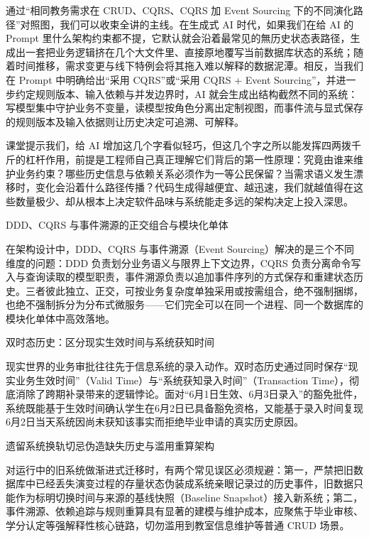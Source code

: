 \documentclass[UTF8,a4paper,11pt,fontset=fandol]{ctexart}
\begin{document}
通过“相同教务需求在 CRUD、CQRS、CQRS 加 Event Sourcing 下的不同演化路径”对照图，我们可以收束全讲的主线。在生成式 AI 时代，如果我们在给 AI 的 Prompt 里什么架构约束都不提，它默认就会沿着最常见的無历史状态表路径，生成出一套把业务逻辑挤在几个大文件里、直接原地覆写当前数据库状态的系统；随着时间推移，需求变更与线下特例会将其拖入难以解释的数据泥潭。相反，当我们在 Prompt 中明确给出“采用 CQRS”或“采用 CQRS + Event Sourcing”，并进一步约定规则版本、输入依赖与并发边界时，AI 就会生成出结构截然不同的系统：写模型集中守护业务不变量，读模型按角色分离出定制视图，而事件流与显式保存的规则版本及输入依据则让历史决定可追溯、可解释。

课堂提示我们，给 AI 增加这几个字看似轻巧，但这几个字之所以能发挥四两拨千斤的杠杆作用，前提是工程师自己真正理解它们背后的第一性原理：究竟由谁来维护业务约束？哪些历史信息与依赖关系必须作为一等公民保留？当需求语义发生漂移时，变化会沿着什么路径传播？代码生成得越便宜、越迅速，我们就越值得在这些数量极少、却从根本上决定软件品味与系统能走多远的架构决定上投入深思。

\begin{importantbox}{DDD、CQRS 与事件溯源的正交组合与模块化单体}

在架构设计中，DDD、CQRS 与事件溯源（Event Sourcing）解决的是三个不同维度的问题：DDD 负责划分业务语义与限界上下文边界，CQRS 负责分离命令写入与查询读取的模型职责，事件溯源负责以追加事件序列的方式保存和重建状态历史。三者彼此独立、正交，可按业务复杂度单独采用或按需组合，绝不强制捆绑，也绝不强制拆分为分布式微服务——它们完全可以在同一个进程、同一个数据库的模块化单体中高效落地。

\end{importantbox}

\begin{knowledgebox}{双时态历史：区分现实生效时间与系统获知时间}

现实世界的业务审批往往先于信息系统的录入动作。双时态历史通过同时保存“现实业务生效时间”（Valid Time）与“系统获知录入时间”（Transaction Time），彻底消除了跨期补录带来的逻辑悖论。面对“6月1日生效、6月3日录入”的豁免批件，系统既能基于生效时间确认学生在6月2日已具备豁免资格，又能基于录入时间复现6月2日当天系统因尚未获知该事实而拒绝毕业申请的真实历史原因。

\end{knowledgebox}

\begin{warningbox}{遗留系统换轨切忌伪造缺失历史与滥用重算架构}

对运行中的旧系统做渐进式迁移时，有两个常见误区必须规避：第一，严禁把旧数据库中已经丢失演变过程的存量状态伪装成系统亲眼记录过的历史事件，旧数据只能作为标明切换时间与来源的基线快照（Baseline Snapshot）接入新系统；第二，事件溯源、依赖追踪与规则重算具有显著的建模与维护成本，应聚焦于毕业审核、学分认定等强解释性核心链路，切勿滥用到教室信息维护等普通 CRUD 场景。

\end{warningbox}
\end{document}
